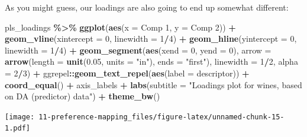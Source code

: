 \documentclass[
]{book}
\newenvironment{Shaded}{\begin{snugshade}}{\end{snugshade}}
\newcommand{\AttributeTok}[1]{\textcolor[rgb]{0.13,0.29,0.53}{#1}}
\newcommand{\DecValTok}[1]{\textcolor[rgb]{0.00,0.00,0.81}{#1}}
\newcommand{\FloatTok}[1]{\textcolor[rgb]{0.00,0.00,0.81}{#1}}
\newcommand{\FunctionTok}[1]{\textcolor[rgb]{0.13,0.29,0.53}{\textbf{#1}}}
\newcommand{\NormalTok}[1]{#1}
\newcommand{\SpecialCharTok}[1]{\textcolor[rgb]{0.81,0.36,0.00}{\textbf{#1}}}
\newcommand{\StringTok}[1]{\textcolor[rgb]{0.31,0.60,0.02}{#1}}
\begin{document}
As you might guess, our loadings are also going to end up somewhat different:

\begin{Shaded}
\begin{Highlighting}[]
\NormalTok{pls\_loadings }\SpecialCharTok{\%\textgreater{}\%}
  \FunctionTok{ggplot}\NormalTok{(}\FunctionTok{aes}\NormalTok{(}\AttributeTok{x =} \StringTok{\textasciigrave{}}\AttributeTok{Comp 1}\StringTok{\textasciigrave{}}\NormalTok{, }\AttributeTok{y =} \StringTok{\textasciigrave{}}\AttributeTok{Comp 2}\StringTok{\textasciigrave{}}\NormalTok{)) }\SpecialCharTok{+} 
  \FunctionTok{geom\_vline}\NormalTok{(}\AttributeTok{xintercept =} \DecValTok{0}\NormalTok{, }\AttributeTok{linewidth =} \DecValTok{1}\SpecialCharTok{/}\DecValTok{4}\NormalTok{) }\SpecialCharTok{+} 
  \FunctionTok{geom\_hline}\NormalTok{(}\AttributeTok{yintercept =} \DecValTok{0}\NormalTok{, }\AttributeTok{linewidth =} \DecValTok{1}\SpecialCharTok{/}\DecValTok{4}\NormalTok{) }\SpecialCharTok{+} 
  \FunctionTok{geom\_segment}\NormalTok{(}\FunctionTok{aes}\NormalTok{(}\AttributeTok{xend =} \DecValTok{0}\NormalTok{, }\AttributeTok{yend =} \DecValTok{0}\NormalTok{),}
               \AttributeTok{arrow =} \FunctionTok{arrow}\NormalTok{(}\AttributeTok{length =} \FunctionTok{unit}\NormalTok{(}\FloatTok{0.05}\NormalTok{, }\AttributeTok{units =} \StringTok{"in"}\NormalTok{), }\AttributeTok{ends =} \StringTok{"first"}\NormalTok{),}
               \AttributeTok{linewidth =} \DecValTok{1}\SpecialCharTok{/}\DecValTok{2}\NormalTok{, }\AttributeTok{alpha =} \DecValTok{2}\SpecialCharTok{/}\DecValTok{3}\NormalTok{) }\SpecialCharTok{+} 
\NormalTok{  ggrepel}\SpecialCharTok{::}\FunctionTok{geom\_text\_repel}\NormalTok{(}\FunctionTok{aes}\NormalTok{(}\AttributeTok{label =}\NormalTok{ descriptor)) }\SpecialCharTok{+} 
  \FunctionTok{coord\_equal}\NormalTok{() }\SpecialCharTok{+} 
\NormalTok{  axis\_labels }\SpecialCharTok{+} 
  \FunctionTok{labs}\NormalTok{(}\AttributeTok{subtitle =} \StringTok{"Loadings plot for wines, based on DA (predictor) data"}\NormalTok{) }\SpecialCharTok{+}
  \FunctionTok{theme\_bw}\NormalTok{()}
\end{Highlighting}
\end{Shaded}

\texttt{[image: 11-preference-mapping\_files/figure-latex/unnamed-chunk-15-1.pdf]}
\end{document}

